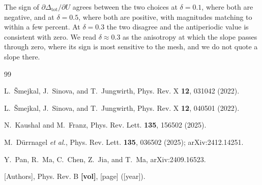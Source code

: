 \documentclass[aps,prb,reprint,superscriptaddress,amsmath,amssymb,floatfix]{revtex4-2}
\begin{document}
The sign of $\partial \Delta_{\mathrm{tot}} / \partial U$ agrees between the two
choices at $\delta = 0.1$, where both are negative, and at $\delta = 0.5$, where
both are positive, with magnitudes matching to within a few percent. At
$\delta = 0.3$ the two disagree and the antiperiodic value is consistent with
zero. We read $\delta \approx 0.3$ as the anisotropy at which the slope passes
through zero, where its sign is most sensitive to the mesh, and we do not quote
a slope there.

\begin{acknowledgments}
\end{acknowledgments}

\begin{thebibliography}{99}


L.~\v{S}mejkal, J.~Sinova, and T.~Jungwirth,
Phys. Rev. X \textbf{12}, 031042 (2022).

L.~\v{S}mejkal, J.~Sinova, and T.~Jungwirth,
Phys. Rev. X \textbf{12}, 040501 (2022).

N.~Kaushal and M.~Franz,
Phys. Rev. Lett. \textbf{135}, 156502 (2025).

M.~D\"urrnagel \textit{et al.},
Phys. Rev. Lett. \textbf{135}, 036502 (2025);
arXiv:2412.14251.

Y.~Pan, R.~Ma, C.~Chen, Z.~Jia, and T.~Ma,
arXiv:2409.16523.

[Authors], Phys. Rev. B \textbf{[vol]}, [page] ([year]).

\end{thebibliography}
\end{document}
